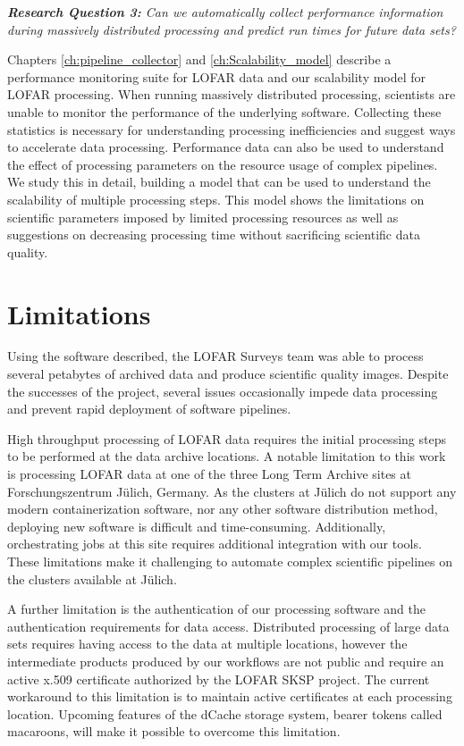 \begin{addmargin}[4em]{8em}%
    \emph{\textbf{Research Question 3:} Can we automatically collect performance information during massively distributed processing and predict run times for future data sets?}
\end{addmargin}

Chapters \ref{ch:pipeline_collector} and \ref{ch:Scalability_model} describe a performance monitoring suite for LOFAR data and our scalability model for LOFAR processing. When running massively distributed processing, scientists are unable to monitor the performance of the underlying software. Collecting these statistics is necessary for understanding processing inefficiencies and suggest ways to accelerate data processing. Performance data can also be used to understand the effect of processing parameters on the resource usage of complex pipelines. We study this in detail, building a model that can be used to understand the scalability of multiple processing steps. This model shows the limitations on scientific parameters imposed by limited processing resources as well as suggestions on decreasing processing time without sacrificing scientific data quality. 

\section{Limitations}

Using the software described, the LOFAR Surveys team was able to process several petabytes of archived data and produce scientific quality images. Despite the successes of the project, several issues occasionally impede data processing and prevent rapid deployment of software pipelines.

High throughput processing of LOFAR data requires the initial processing steps to be performed at the data archive locations. A notable limitation to this work is processing LOFAR data at one of the three Long Term Archive sites at Forschungszentrum J{\"u}lich, Germany. As the clusters at J{\"u}lich do not support any modern containerization software, nor any other software distribution method, deploying new software is difficult and time-consuming. Additionally, orchestrating jobs at this site requires additional integration with our tools. These limitations make it challenging to automate complex scientific pipelines on the clusters available at J{\"u}lich.

A further limitation is the authentication of our processing software and the authentication requirements for data access. Distributed processing of large data sets requires having access to the data at multiple locations, however the intermediate products produced by our workflows are not public and require an active x.509 certificate authorized by the LOFAR SKSP project. The current workaround to this limitation is to maintain active certificates at each processing location. Upcoming features of the dCache storage system, bearer tokens called macaroons, will make it possible to overcome this limitation.

